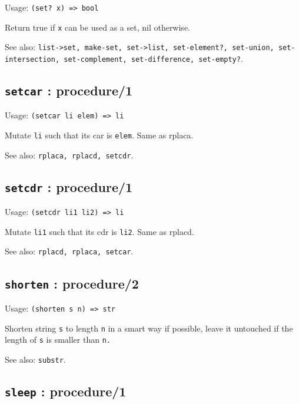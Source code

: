 \documentclass[
]{article}
\newcommand{\passthrough}[1]{#1}
\begin{document}
Usage: \passthrough{\lstinline!(set? x) => bool!}

Return true if \passthrough{\lstinline!x!} can be used as a set, nil
otherwise.

See also:
\passthrough{\lstinline!list->set, make-set, set->list, set-element?, set-union, set-intersection, set-complement, set-difference, set-empty?!}.

\hypertarget{setcar-procedure1-1}{%
\subsection{\texorpdfstring{\texttt{setcar} :
procedure/1}{setcar : procedure/1}}\label{setcar-procedure1-1}}

Usage: \passthrough{\lstinline!(setcar li elem) => li!}

Mutate \passthrough{\lstinline!li!} such that its car is
\passthrough{\lstinline!elem!}. Same as rplaca.

See also: \passthrough{\lstinline!rplaca, rplacd, setcdr!}.

\hypertarget{setcdr-procedure1-1}{%
\subsection{\texorpdfstring{\texttt{setcdr} :
procedure/1}{setcdr : procedure/1}}\label{setcdr-procedure1-1}}

Usage: \passthrough{\lstinline!(setcdr li1 li2) => li!}

Mutate \passthrough{\lstinline!li1!} such that its cdr is
\passthrough{\lstinline!li2!}. Same as rplacd.

See also: \passthrough{\lstinline!rplacd, rplaca, setcar!}.

\hypertarget{shorten-procedure2-1}{%
\subsection{\texorpdfstring{\texttt{shorten} :
procedure/2}{shorten : procedure/2}}\label{shorten-procedure2-1}}

Usage: \passthrough{\lstinline!(shorten s n) => str!}

Shorten string \passthrough{\lstinline!s!} to length
\passthrough{\lstinline!n!} in a smart way if possible, leave it
untouched if the length of \passthrough{\lstinline!s!} is smaller than
\passthrough{\lstinline!n.!}

See also: \passthrough{\lstinline!substr!}.

\hypertarget{sleep-procedure1-1}{%
\subsection{\texorpdfstring{\texttt{sleep} :
procedure/1}{sleep : procedure/1}}\label{sleep-procedure1-1}}
\end{document}
